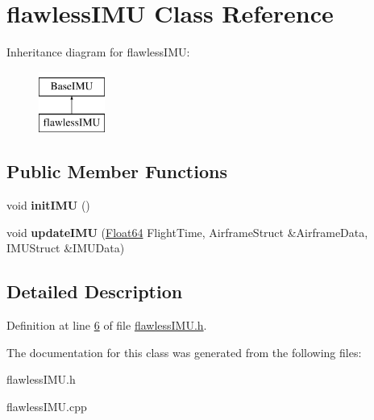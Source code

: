 \hypertarget{classflawless_i_m_u}{}\section{flawless\+I\+MU Class Reference}
\label{classflawless_i_m_u}
Inheritance diagram for flawless\+I\+MU\+:\begin{figure}[H]
\begin{center}
\leavevmode
\includegraphics[height=2.000000cm]{classflawless_i_m_u}
\end{center}
\end{figure}
\subsection*{Public Member Functions}
\begin{DoxyCompactItemize}
\item 
\mbox{\label{classflawless_i_m_u_a509e17535742d72cf8a4a3ee8b01f5d9}} 
void {\bfseries init\+I\+MU} ()
\item 
\mbox{\label{classflawless_i_m_u_a3d3bf018147ba61788fd3e842dded37e}} 
void {\bfseries update\+I\+MU} (\hyperlink{group___tools_ga3f1431cb9f76da10f59246d1d743dc2c}{Float64} Flight\+Time, Airframe\+Struct \&Airframe\+Data, I\+M\+U\+Struct \&I\+M\+U\+Data)
\end{DoxyCompactItemize}


\subsection{Detailed Description}


Definition at line \hyperlink{flawless_i_m_u_8h_source_l00006}{6} of file \hyperlink{flawless_i_m_u_8h_source}{flawless\+I\+M\+U.\+h}.



The documentation for this class was generated from the following files\+:\begin{DoxyCompactItemize}
\item 
flawless\+I\+M\+U.\+h\item 
flawless\+I\+M\+U.\+cpp\end{DoxyCompactItemize}
